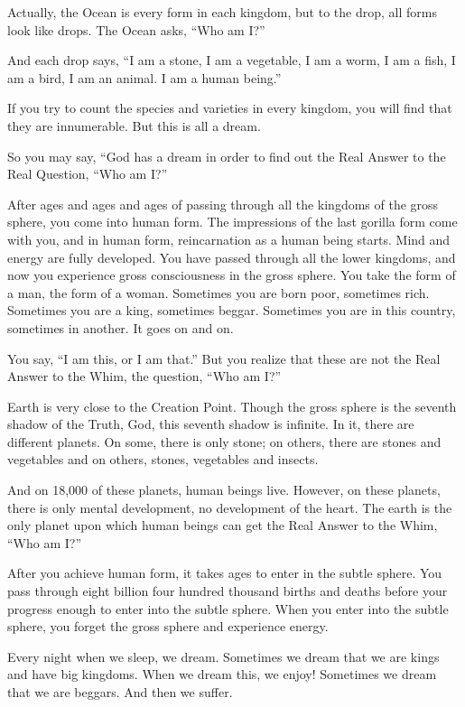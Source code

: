 Actually, the Ocean is every form in each kingdom, but to the drop, all forms look like drops. The Ocean asks, ``Who am I?''

And each drop says, ``I am a stone, I am a vegetable, I am a worm, I am a fish, I am a bird, I am an animal. I am a human being.''

If you try to count the species and varieties in every kingdom, you will find that they are innumerable. But this is all a dream.

So you may say, ``God has a dream in order to find out the Real Answer to the Real Question, ``Who am I?''

After ages and ages and ages of passing through all the kingdoms of the gross sphere, you come into human form. The impressions of the last gorilla form come with you, and in human form, reincarnation as a human being starts. Mind and energy are fully developed. You have passed through all the lower kingdoms, and now you experience gross consciousness in the gross sphere. You take the form of a man, the form of a woman. Sometimes you are born poor, sometimes rich. Sometimes you are a king, sometimes beggar. Sometimes you are in this country, sometimes in another. It goes on and on.

You say, ``I am this, or I am that.'' But you realize that these are not the Real Answer to the Whim, the question, ``Who am I?''

Earth is very close to the Creation Point. Though the gross sphere is the seventh shadow of the Truth, God, this seventh shadow is infinite. In it, there are different planets. On some, there is only stone; on others, there are stones and vegetables and on others, stones, vegetables and insects.

And on 18,000 of these planets, human beings live. However, on these planets, there is only mental development, no development of the heart. The earth is the only planet upon which human beings can get the Real Answer to the Whim, ``Who am I?''

After you achieve human form, it takes ages to enter in the subtle sphere. You pass through eight billion four hundred thousand births and deaths before your progress enough to enter into the subtle sphere. When you enter into the subtle sphere, you forget the gross sphere and experience energy.

Every night when we sleep, we dream. Sometimes we dream that we are kings and have big kingdoms. When we dream this, we enjoy! Sometimes we dream that we are beggars. And then we suffer.

